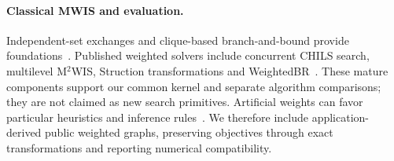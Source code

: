 \paragraph{Classical MWIS and evaluation.}
Independent-set exchanges and clique-based branch-and-bound provide
foundations~\cite{andrade2012local,ostergard2002clique}. Published weighted solvers
include concurrent CHILS search, multilevel M$^2$WIS, Struction transformations
and WeightedBR~\cite{grossmann2025chils,grossmann2024mmwis,gellner2021struction,lamm2019weighted}.
These mature components support our common kernel and separate algorithm
comparisons; they are not claimed as new search primitives. Artificial weights
can favor particular heuristics and inference rules~\cite{mccreesh2017evaluation}.
We therefore include application-derived public weighted graphs, preserving
objectives through exact transformations and reporting numerical compatibility.
